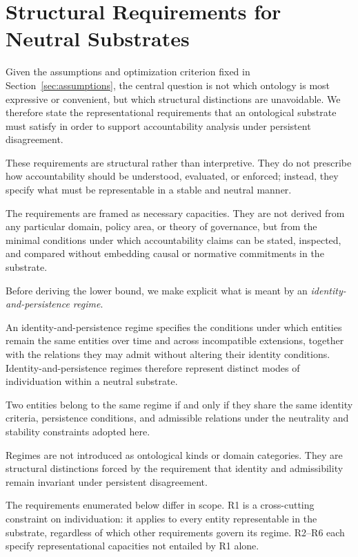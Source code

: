 \section{Structural Requirements for Neutral Substrates}
\label{sec:requirements}

Given the assumptions and optimization criterion
fixed in Section~\ref{sec:assumptions},
the central question is not which ontology is most expressive or convenient,
but which structural distinctions are unavoidable.
We therefore state the representational requirements
that an ontological substrate must satisfy in order to
support accountability analysis under persistent disagreement.

These requirements are structural rather than interpretive.
They do not prescribe how accountability
should be understood, evaluated, or enforced; instead,
they specify what must be representable in a stable and neutral manner.

The requirements are framed as necessary capacities.
They are not derived from any
particular domain, policy area, or theory of governance,
but from the minimal conditions under which accountability claims
can be stated, inspected, and compared
without embedding causal or normative commitments in the substrate.

Before deriving the lower bound, we make explicit what is meant by an
\emph{identity-and-persistence regime}.

An identity-and-persistence regime specifies the conditions under which
entities remain the same entities over time and across incompatible extensions,
together with the relations they may admit without altering their identity conditions.
Identity-and-persistence regimes therefore represent
distinct modes of individuation within a neutral substrate.

Two entities belong to the same regime if and only if
they share the same \stabilitycritical{} identity criteria,
persistence conditions, and admissible relations under
the neutrality and stability constraints adopted here.

Regimes are not introduced as ontological kinds or domain categories.
They are structural distinctions forced by the requirement that identity and
admissibility remain invariant under persistent disagreement.

The requirements enumerated below differ in scope.
R1 is a cross-cutting constraint on individuation:
it applies to every entity representable in the substrate,
regardless of which other requirements govern its regime.
R2--R6 each specify representational capacities not entailed by R1 alone.

